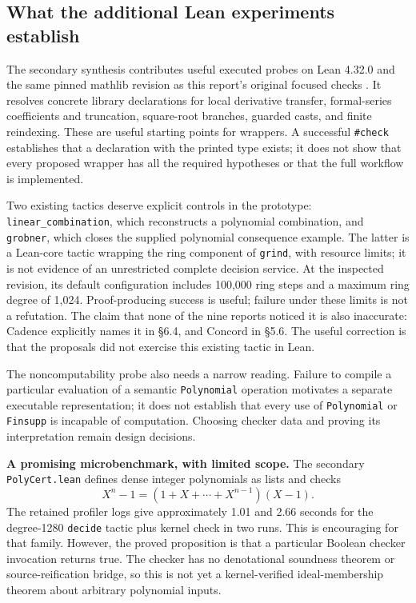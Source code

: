 \documentclass[11pt,letterpaper]{article}
\newcommand{\code}[1]{\nolinkurl{#1}}
\begin{document}
\subsection{What the additional Lean experiments establish}\label{sec:secondarylean}
The secondary synthesis contributes useful executed probes on Lean 4.32.0 and
the same pinned mathlib revision as this report's original focused checks
\cite[\S7]{secondary}. It resolves concrete library declarations for local
derivative transfer, formal-series coefficients and truncation, square-root
branches, guarded casts, and finite reindexing. These are useful starting points
for wrappers. A successful \texttt{\#check} establishes that a declaration with
the printed type exists; it does not show that every proposed wrapper has all
the required hypotheses or that the full workflow is implemented.

Two existing tactics deserve explicit controls in the prototype:
\texttt{linear\_combination}, which reconstructs a polynomial combination,
and \texttt{grobner}, which closes the supplied polynomial consequence example.
The latter is a Lean-core tactic wrapping the ring component of \texttt{grind},
with resource limits; it is not evidence of an unrestricted complete
decision service. At the inspected revision, its default configuration includes
100,000 ring steps and a maximum ring degree of 1,024. Proof-producing success
is useful; failure under these limits is not a refutation. The claim
that none of the nine reports noticed it is also inaccurate: Cadence explicitly
names it in \S6.4, and Concord in \S5.6. The useful correction is that the
proposals did not exercise this existing tactic in Lean.

The noncomputability probe also needs a narrow reading. Failure to compile a
particular evaluation of a semantic \texttt{Polynomial} operation motivates a
separate executable representation; it does not establish that every use of
\texttt{Polynomial} or \texttt{Finsupp} is incapable of computation. Choosing
checker data and proving its interpretation remain design decisions.

\textbf{A promising microbenchmark, with limited scope.} The secondary
\code{PolyCert.lean} defines dense integer polynomials as lists and checks
\[
 X^n-1=(1+X+\cdots+X^{n-1})(X-1).
\]
The retained profiler logs give approximately 1.01 and 2.66 seconds for the
degree-1280 \texttt{decide} tactic plus kernel check in two runs. This is
encouraging for that family. However, the proved proposition is that a particular
Boolean checker invocation returns true. The checker has no denotational
soundness theorem or source-reification bridge, so this is not yet a
kernel-verified ideal-membership theorem about arbitrary polynomial inputs.
\end{document}
